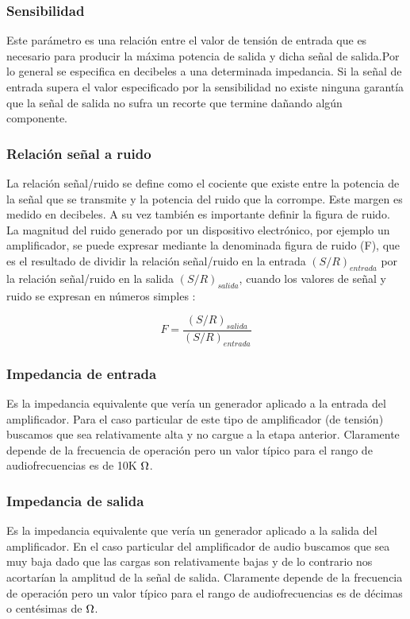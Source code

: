 \subsubsection*{Sensibilidad}

Este parámetro es una relación entre el valor de tensión de entrada que es necesario para producir la máxima potencia de salida y dicha señal de salida.Por lo general se especifica en decibeles a una determinada impedancia. Si la señal de entrada supera el valor especificado por la sensibilidad no existe ninguna garantía que la señal de salida no sufra un recorte que termine dañando algún componente.
\medskip 
\subsubsection*{Relación señal a ruido}

La relación señal/ruido se define como el cociente que existe entre la potencia de la señal que se transmite y la potencia del ruido que la corrompe. Este margen es medido en decibeles. A su vez también es importante definir la figura de ruido. La magnitud del ruido generado por un dispositivo electrónico, por ejemplo un amplificador, se puede expresar mediante la denominada figura de ruido (F), que es el resultado de dividir la relación señal/ruido en la entrada $(S/R)_{entrada}$ por la relación señal/ruido en la salida $(S/R)_{salida}$, cuando los valores de señal y ruido se expresan en números simples :

\begin{equation}
F=\frac{(S/R)_{salida}}{(S/R)_{entrada}}
\end{equation}
\medskip 
\subsubsection*{Impedancia de entrada}


 Es la impedancia equivalente que vería un generador aplicado a la entrada del amplificador. Para el caso particular de este tipo de amplificador (de tensión) buscamos que sea relativamente alta y no cargue a la etapa anterior. Claramente depende de la frecuencia de operación pero un valor típico para el rango de audiofrecuencias es de 10K $\ohm$.
\medskip 
\subsubsection*{Impedancia de salida}


Es la impedancia equivalente que vería un generador aplicado a la salida del amplificador. En el caso particular del amplificador de audio buscamos que sea muy baja dado que las cargas son relativamente bajas y de lo contrario nos acortarían la amplitud de la señal de salida. Claramente depende de la frecuencia de operación pero un valor típico para el rango de audiofrecuencias es de décimas o centésimas de $\ohm$.
\medskip 
